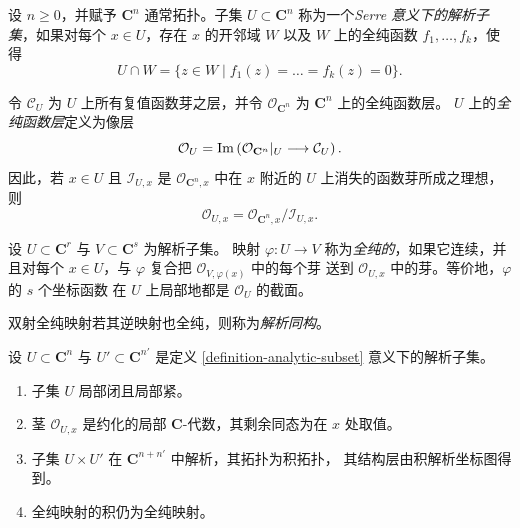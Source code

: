 \begin{definition}
\label{definition-analytic-subset}
\begin{reference}
\cite[\S 1，第 1 号，第 3--4 页]{GAGA}
\end{reference}
设 $n \geq 0$，并赋予 $\mathbf C^n$ 通常拓扑。子集
$U \subset \mathbf C^n$ 称为一个{\it Serre 意义下的解析子集}，如果对每个
$x \in U$，存在 $x$ 的开邻域 $W$ 以及 $W$ 上的全纯函数
$f_1, \ldots, f_k$，使得
$$
U \cap W = \{z \in W \mid f_1(z)=\ldots=f_k(z)=0\}.
$$

令 $\mathcal C_U$ 为 $U$ 上所有复值函数芽之层，并令
$\mathcal O_{\mathbf C^n}$ 为 $\mathbf C^n$ 上的全纯函数层。
$U$ 上的{\it 全纯函数层}定义为像层
$$
\mathcal O_U =
\mathop{\rm Im}\left(
\mathcal O_{\mathbf C^n}|_U \longrightarrow \mathcal C_U
\right).
$$
因此，若 $x \in U$ 且 $\mathcal I_{U,x}$ 是
$\mathcal O_{\mathbf C^n,x}$ 中在 $x$ 附近的 $U$ 上消失的函数芽所成之理想，则
$$
\mathcal O_{U,x}=
\mathcal O_{\mathbf C^n,x}/\mathcal I_{U,x}.
$$
\end{definition}

\begin{definition}
\label{definition-holomorphic-map-analytic-subsets}
\begin{reference}
\cite[\S 1，第 1 号，第 3--4 页]{GAGA}
\end{reference}
设 $U \subset \mathbf C^r$ 与 $V \subset \mathbf C^s$ 为解析子集。
映射 $\varphi:U\to V$ 称为{\it 全纯的}，如果它连续，并且对每个
$x\in U$，与 $\varphi$ 复合把 $\mathcal O_{V,\varphi(x)}$ 中的每个芽
送到 $\mathcal O_{U,x}$ 中的芽。等价地，$\varphi$ 的 $s$ 个坐标函数
在 $U$ 上局部地都是 $\mathcal O_U$ 的截面。

双射全纯映射若其逆映射也全纯，则称为{\it 解析同构}。
\end{definition}

\begin{lemma}
\label{lemma-analytic-subset-basic-properties}
设 $U \subset \mathbf C^n$ 与 $U' \subset \mathbf C^{n'}$ 是定义
\ref{definition-analytic-subset} 意义下的解析子集。
\begin{enumerate}
\item 子集 $U$ 局部闭且局部紧。
\item 茎 $\mathcal O_{U,x}$ 是约化的局部 $\mathbf C$-代数，其剩余同态为在 $x$ 处取值。
\item 子集 $U\times U'$ 在 $\mathbf C^{n+n'}$ 中解析，其拓扑为积拓扑，
其结构层由积解析坐标图得到。
\item 全纯映射的积仍为全纯映射。
\end{enumerate}
\end{lemma}

